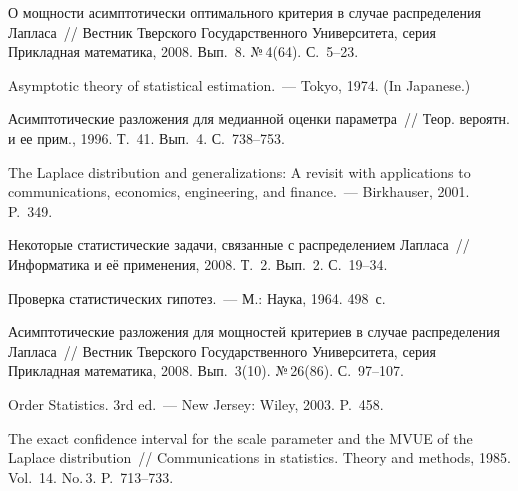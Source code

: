 \begin{multicols}{2}
{{\begin{thebibliography}{9}
О мощ\-ности асимптотически оптимального критерия в случае 
распределения Лапласа~// Вестник Тверского Государственного Университета, 
серия Прикладная математика, 2008. Вып.~8. №\,4(64). С.~5--23.

Asymptotic theory of statistical estimation.~---  Tokyo, 1974. (In Japanese.)

Асимптотические разложения для 
медианной оценки параметра~// Теор. вероятн. и ее
прим., 1996. Т.~41. Вып.~4. С.~738--753.

The Laplace distribution and generalizations: 
A revisit with applications to communications, economics, engineering, 
and finance.~--- Birkhauser, 2001.  P.~349.

Некоторые статистические  задачи, связанные с распределением Лапласа~// 
Информатика и её применения, 2008. Т.~2.  Вып.~2. С.~19--34.

Проверка статистических гипотез.~--- М.: Наука, 1964. 498~с.

Асимптотические 
разложения для мощностей критериев в случае распределения Лапласа~//
Вестник Тверского Государственного Университета, серия 
Прикладная математика, 2008. Вып.~3(10). №\,26(86). С.~97--107.

Order Statistics.  3rd ed.~--- New Jersey: Wiley, 2003.  P.~458.

\label{end\stat}

The exact confidence interval for 
the scale parameter and the MVUE of the Laplace distribution~// 
Communications in statistics. Theory and methods, 1985. Vol.~14. No.\,3. 
P.~713--733.

 \end{thebibliography}
}
}
\end{multicols}